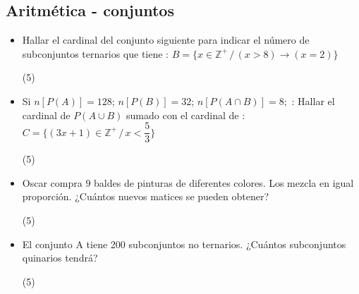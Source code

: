 \documentclass[11pt, twocolumn, landscape, a4paper]{article}
\begin{document}
\subsection*{Aritmética - conjuntos}
\begin{itemize}
\item{Hallar el cardinal del conjunto siguiente para indicar el número de subconjuntos ternarios que tiene : $B = \{x \in \mathbb{Z}^{+}\,/\,(x > 8) \to (x = 2)\}$ 
\begin{tasks}(5)
\end{tasks}
}
\item{Si $n[P(A)] = 128$; $n[P(B)] = 32$; $n[P(A \cap B)] = 8;$ : Hallar el cardinal de $P(A \cup B)$ sumado con el cardinal de : $C = \Big\{(3x + 1) \in \mathbb{Z}^{+}\,/\,x < \dfrac{5}{3}\Big\}$
\begin{tasks}(5)
\end{tasks}
}
\item{Oscar compra $9$ baldes de pinturas de diferentes colores. Los mezcla en igual proporción. ¿Cuántos nuevos matices se pueden obtener?
\begin{tasks}(5)
\end{tasks}
}
\item{El conjunto A tiene 200 subconjuntos no ternarios. ¿Cuántos subconjuntos quinarios tendrá?
\begin{tasks}(5)
\end{tasks}
}
\end{itemize}
\end{document}
